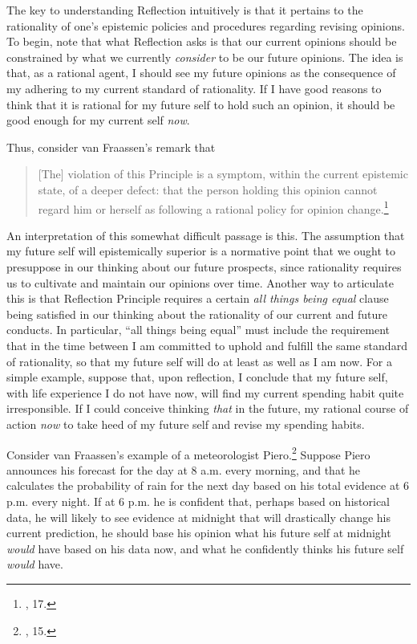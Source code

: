 The key to understanding Reflection intuitively is that it pertains to
the rationality of one's epistemic policies and procedures regarding
revising opinions. To begin, note that what Reflection asks is that our
current opinions should be constrained by what we currently
\emph{consider} to be our future opinions. The idea is that, as a
rational agent, I should see my future opinions as the consequence of my
adhering to my current standard of rationality. If I have good reasons
to think that it is rational for my future self to hold such an opinion,
it should be good enough for my current self \emph{now}.

Thus, consider van Fraassen's remark that

\begin{quote}
	{[}The{]} violation of this Principle is a symptom, within the current
epistemic state, of a deeper defect: that the person holding this
opinion cannot regard him or herself as following a rational policy for
opinion change.\footnote{\cite{beliefuly}, 17.}
\end{quote}


An interpretation of this somewhat difficult passage is this. The assumption  that my future self will epistemically superior is a normative point that we ought to presuppose in our thinking about our future prospects, since rationality 
requires us to cultivate and maintain our opinions over time. Another way 
to articulate this is that Reflection Principle requires a certain \emph{all things being equal} clause being satisfied in our thinking about the rationality of our current and future conducts. In
particular, ``all things being equal'' must include the requirement that
in the time between I am committed to uphold and fulfill the same
standard of rationality, so that my future self will do at least as well
as I am now. For a simple example, suppose that, upon reflection, I
conclude that my future self, with life experience I do not have now,
will find my current spending habit quite irresponsible. If I could
conceive thinking \emph{that} in the future, my rational course of
action \emph{now} to take heed of my future self and revise my spending
habits.

Consider van Fraassen's example of a meteorologist Piero.\footnote{\cite{beliefuly}, 15.} Suppose Piero announces his forecast for the day at 8
a.m. every morning, and that he calculates the probability of rain for
the next day based on his total evidence at 6 p.m. every night. If at 6
p.m. he is confident that, perhaps based on historical data, he will
likely to see evidence at midnight that will drastically change his
current prediction, he should base his opinion what his future self at
midnight \emph{would} have based on his data now, and what he
confidently thinks his future self \emph{would} have.

